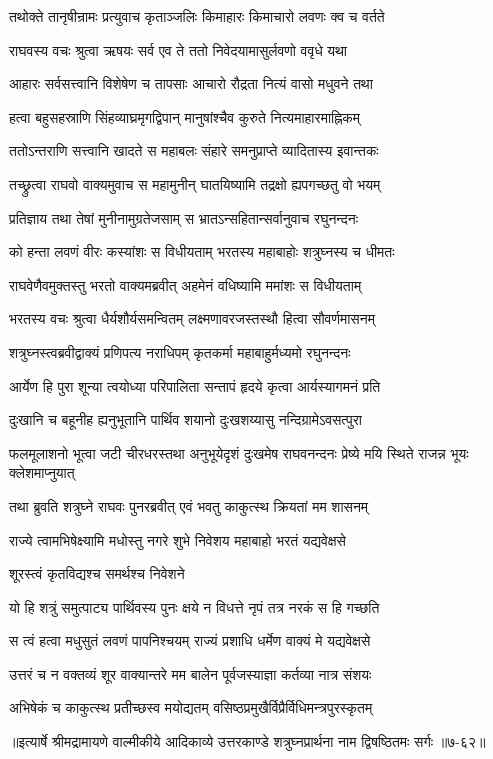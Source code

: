 
\twolineshloka
{तथोक्ते तानृषीन्रामः प्रत्युवाच कृताञ्जलिः}
{किमाहारः किमाचारो लवणः क्व च वर्तते} %

\twolineshloka
{राघवस्य वचः श्रुत्वा ऋषयः सर्व एव ते}
{ततो निवेदयामासुर्लवणो ववृधे यथा} %

\twolineshloka
{आहारः सर्वसत्त्वानि विशेषेण च तापसाः}
{आचारो रौद्रता नित्यं वासो मधुवने तथा} %

\twolineshloka
{हत्वा बहुसहस्राणि सिंहव्याघ्रमृगद्विपान्}
{मानुषांश्चैव कुरुते नित्यमाहारमाह्निकम्} %

\twolineshloka
{ततोऽन्तराणि सत्त्वानि खादते स महाबलः}
{संहारे समनुप्राप्ते व्यादितास्य इवान्तकः} %

\twolineshloka
{तच्छ्रुत्वा राघवो वाक्यमुवाच स महामुनीन्}
{घातयिष्यामि तद्रक्षो ह्यपगच्छतु वो भयम्} %

\twolineshloka
{प्रतिज्ञाय तथा तेषां मुनीनामुग्रतेजसाम्}
{स भ्रातऽन्सहितान्सर्वानुवाच रघुनन्दनः} %

\twolineshloka
{को हन्ता लवणं वीरः कस्यांशः स विधीयताम्}
{भरतस्य महाबाहोः शत्रुघ्नस्य च धीमतः} %

\twolineshloka
{राघवेणैवमुक्तस्तु भरतो वाक्यमब्रवीत्}
{अहमेनं वधिष्यामि ममांशः स विधीयताम्} %

\twolineshloka
{भरतस्य वचः श्रुत्वा धैर्यशौर्यसमन्वितम्}
{लक्ष्मणावरजस्तस्थौ हित्वा सौवर्णमासनम्} %

\twolineshloka
{शत्रुघ्नस्त्वब्रवीद्वाक्यं प्रणिपत्य नराधिपम्}
{कृतकर्मा महाबाहुर्मध्यमो रघुनन्दनः} %

\twolineshloka
{आर्येण हि पुरा शून्या त्वयोध्या परिपालिता}
{सन्तापं हृदये कृत्वा आर्यस्यागमनं प्रति} %

\twolineshloka
{दुःखानि च बहूनीह ह्यनुभूतानि पार्थिव}
{शयानो दुःखशय्यासु नन्दिग्रामेऽवसत्पुरा} %

\threelineshloka
{फलमूलाशनो भूत्वा जटी चीरधरस्तथा}
{अनुभूयेदृशं दुःखमेष राघवनन्दनः}
{प्रेष्ये मयि स्थिते राजन्न भूयः क्लेशमाप्नुयात्} %

\twolineshloka
{तथा ब्रुवति शत्रुघ्ने राघवः पुनरब्रवीत्}
{एवं भवतु काकुत्स्थ क्रियतां मम शासनम्} %

\twolineshloka
{राज्ये त्वामभिषेक्ष्यामि मधोस्तु नगरे शुभे}
{निवेशय महाबाहो भरतं यद्यवेक्षसे} %

\onelineshloka
{शूरस्त्वं कृतविद्यश्च समर्थश्च निवेशने} %

\twolineshloka
{यो हि शत्रुं समुत्पाट्य पार्थिवस्य पुनः क्षये}
{न विधत्ते नृपं तत्र नरकं स हि गच्छति} %

\twolineshloka
{स त्वं हत्वा मधुसुतं लवणं पापनिश्चयम्}
{राज्यं प्रशाधि धर्मेण वाक्यं मे यद्यवेक्षसे} %

\twolineshloka
{उत्तरं च न वक्तव्यं शूर वाक्यान्तरे मम}
{बालेन पूर्वजस्याज्ञा कर्तव्या नात्र संशयः} %

\twolineshloka
{अभिषेकं च काकुत्स्थ प्रतीच्छस्व मयोद्यतम्}
{वसिष्ठप्रमुखैर्विप्रैर्विधिमन्त्रपुरस्कृतम्} %


॥इत्यार्षे श्रीमद्रामायणे वाल्मीकीये आदिकाव्ये उत्तरकाण्डे शत्रुघ्नप्रार्थना नाम द्विषष्ठितमः सर्गः ॥७-६२॥
